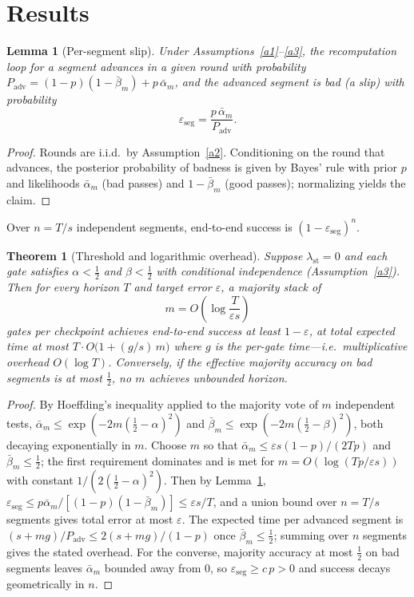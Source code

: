 \documentclass[11pt]{article}
\newtheorem{theorem}{Theorem}
\newtheorem{lemma}{Lemma}
\theoremstyle{remark}
\newcommand{\lst}{\lambda_{\mathrm{st}}}
\newcommand{\Padv}{P_{\mathrm{adv}}}
\newcommand{\eseg}{\varepsilon_{\mathrm{seg}}}
\newcommand{\am}{\bar\alpha_m}
\newcommand{\bm}{\bar\beta_m}
\begin{document}
\section{Results}

\begin{lemma}[Per-segment slip]\label{lem:slip}
Under Assumptions~\ref{a1}--\ref{a3}, the recomputation loop for a segment advances in a given
round with probability $\Padv=(1-p)(1-\bm)+p\,\am$, and the advanced segment is bad (a \emph{slip})
with probability
\[
\eseg=\frac{p\,\am}{\Padv}.
\]
\end{lemma}
\begin{proof}
Rounds are i.i.d.\ by Assumption~\ref{a2}. Conditioning on the round that advances, the posterior
probability of badness is given by Bayes' rule with prior $p$ and likelihoods $\am$ (bad passes)
and $1-\bm$ (good passes);
normalizing yields the claim.
\end{proof}

\noindent Over $n=T/s$ independent segments, end-to-end success is $(1-\eseg)^n$.
\begin{theorem}[Threshold and logarithmic overhead]\label{thm:threshold}
Suppose $\lst=0$ and each gate satisfies $\alpha<\tfrac12$ and $\beta<\tfrac12$ with conditional
independence (Assumption~\ref{a3}).
Then for every horizon $T$ and target error $\varepsilon$, a
majority stack of
\[
m=O\!\left(\log\frac{T}{\varepsilon s}\right)
\]
gates per checkpoint achieves end-to-end success at least $1-\varepsilon$, at total expected time
at most $T\cdot O\!\big(1+(g/s)\,m\big)$ where $g$ is the per-gate time---i.e.\ multiplicative
overhead $O(\log T)$.
Conversely, if the effective majority accuracy on bad segments is at most
$\tfrac12$, no $m$ achieves unbounded horizon.
\end{theorem}
\begin{proof}
By Hoeffding's inequality applied to the majority vote of $m$ independent tests,
$\am\le\exp(-2m(\tfrac12-\alpha)^2)$ and $\bm\le\exp(-2m(\tfrac12-\beta)^2)$, both decaying
exponentially in $m$.
Choose $m$ so that $\am\le\varepsilon s(1-p)/(2Tp)$ and $\bm\le\tfrac12$;
the first requirement dominates and is met for $m=O(\log(Tp/\varepsilon s))$ with constant
$1/(2(\tfrac12-\alpha)^2)$.
Then by Lemma~\ref{lem:slip},
$\eseg\le p\am/[(1-p)(1-\bm)]\le\varepsilon s/T$, and a union bound over $n=T/s$ segments gives
total error at most $\varepsilon$.
The expected time per advanced segment is
$(s+mg)/\Padv\le 2(s+mg)/(1-p)$ once $\bm\le\tfrac12$; summing over $n$ segments gives the stated
overhead.
For the converse, majority accuracy at most $\tfrac12$ on bad segments leaves $\am$
bounded away from $0$, so $\eseg\ge c\,p>0$ and success decays geometrically in $n$.
\end{proof}
\end{document}
